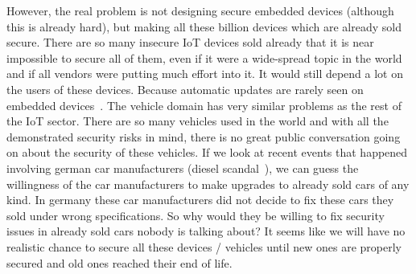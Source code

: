 However, the real problem is not designing secure embedded devices (although
this is already hard), but making all these billion devices which are already
sold secure. There are so many insecure IoT devices sold already that it is near
impossible to secure all of them, even if it were a wide-spread topic in the
world and if all vendors were putting much effort into it. It would still depend
a lot on the users of these devices. Because automatic updates are rarely seen on
embedded devices~\cite{Viega2012}. The vehicle domain has very similar problems as the
rest of the IoT sector. There are so many vehicles used in the world and with
all the demonstrated security risks in mind, there is no great public
conversation going on about the security of these vehicles. If we look at recent
events that happened involving german car manufacturers (diesel
scandal~\cite{spiegel17}), we can guess the willingness of the car manufacturers
to make upgrades to already sold cars of any kind. In germany these car
manufacturers did not decide to fix these cars they sold under wrong
specifications. So why would they be willing to fix security issues in already
sold cars nobody is talking about? It seems like we will have no realistic
chance to secure all these devices / vehicles until new ones are properly
secured and old ones reached their end of life.

